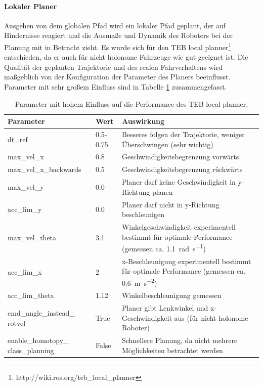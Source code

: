 \paragraph{Lokaler Planer}
Ausgehen von dem globalen Pfad wird ein lokaler Pfad geplant, der auf Hindernisse reagiert und die Ausma\ss{}e und Dynamik des Roboters bei der Planung mit in Betracht zieht. Es wurde sich f\"ur den TEB local planner\footnote{http://wiki.ros.org/teb\_local\_planner} entschieden, da er auch f\"ur nicht holonome Fahrzeuge wie gut geeignet ist. Die Qualit\"at der geplanten Trajektorie und des realen Fahrverhaltens wird ma\ss{}geblich von der Konfiguration der Parameter des Planers beeinflusst. Parameter mit sehr gro\ss{}em Einfluss sind in Tabelle \ref{tab:TEB} zusammengefasst.

\begin{table}[h]
	\centering
	\renewcommand{\arraystretch}{1.2}
	\begin{tabular}{p{4cm}l p{9cm}}
		Parameter & Wert  & Auswirkung \\ \hline
		dt\_ref & 0.5-0.75 & Besseres folgen der Trajektorie, weniger \"Uberschwingen (sehr wichtig)\\ 
		max\_vel\_x & 0.8 & Geschwindigkeitsbegrenzung vorw\"arts\\
		max\_vel\_x\_backwards & 0.5 & Geschwindigkeitsbegrenzung r\"uckw\"arts\\
		max\_vel\_y & 0.0 & Planer darf keine Geschwindigkeit in y-Richtung planen\\
		acc\_lim\_y & 0.0 & Planer darf nicht in y-Richtung beschleunigen\\
		max\_vel\_theta & 3.1 & Winkelgeschwindigkeit experimentell bestimmt f\"ur optimale Performance (gemessen ca. \SI[per-mode=fraction]{1.1}{\radian\per\second})\\
		acc\_lim\_x & 2 & x-Beschleunigung experimentell bestimmt f\"ur optimale Performance (gemessen ca. \SI[per-mode=fraction]{0.6}{\meter\per\second\squared})\\
		acc\_lim\_theta& 1.12 & Winkelbeschleunigung gemessen\\
		cmd\_angle\_instead\_ rotvel & True & Planer gibt Lenkwinkel und x-Geschwindigkeit aus (f\"ur nicht holonome Roboter) \\
		enable\_homotopy\_ class\_planning & False & Schnellere Planung, da nicht mehrere M\"oglichkeiten betrachtet werden
	\end{tabular}
	\caption{Parameter mit hohem Einfluss auf die Performance des TEB local planner.}
	\label{tab:TEB}
\end{table}

